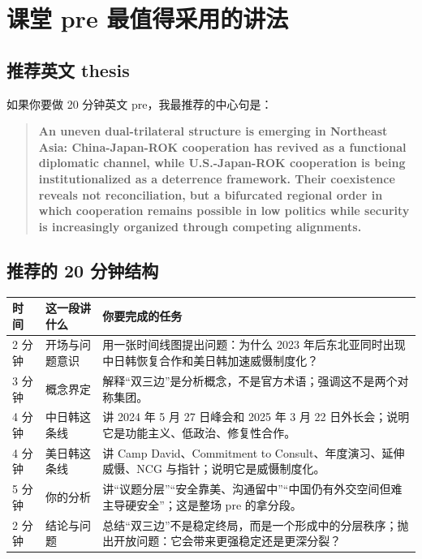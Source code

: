 \documentclass[a4paper]{article}
\begin{document}
\section{课堂 pre 最值得采用的讲法}

\subsection{推荐英文 thesis}

如果你要做 20 分钟英文 pre，我最推荐的中心句是：

\begin{quote}
\textbf{An uneven dual-trilateral structure is emerging in Northeast Asia: China-Japan-ROK cooperation has revived as a functional diplomatic channel, while U.S.-Japan-ROK cooperation is being institutionalized as a deterrence framework. Their coexistence reveals not reconciliation, but a bifurcated regional order in which cooperation remains possible in low politics while security is increasingly organized through competing alignments.}
\end{quote}

\subsection{推荐的 20 分钟结构}

\begin{longtable}{p{2.0cm}p{4.4cm}p{7.2cm}}
\toprule
\textbf{时间} & \textbf{这一段讲什么} & \textbf{你要完成的任务} \\
\midrule
\endhead
2 分钟 & 开场与问题意识 & 用一张时间线图提出问题：为什么 2023 年后东北亚同时出现中日韩恢复合作和美日韩加速威慑制度化？ \\
3 分钟 & 概念界定 & 解释“双三边”是分析概念，不是官方术语；强调这不是两个对称集团。 \\
4 分钟 & 中日韩这条线 & 讲 2024 年 5 月 27 日峰会和 2025 年 3 月 22 日外长会；说明它是功能主义、低政治、修复性合作。 \\
4 分钟 & 美日韩这条线 & 讲 Camp David、Commitment to Consult、年度演习、延伸威慑、NCG 与指针；说明它是威慑制度化。 \\
5 分钟 & 你的分析 & 讲“议题分层”“安全靠美、沟通留中”“中国仍有外交空间但难主导硬安全”；这是整场 pre 的拿分段。 \\
2 分钟 & 结论与问题 & 总结“双三边”不是稳定终局，而是一个形成中的分层秩序；抛出开放问题：它会带来更强稳定还是更深分裂？ \\
\bottomrule
\end{longtable}
\end{document}
